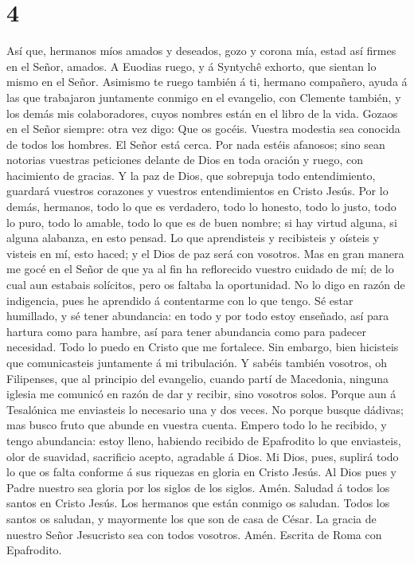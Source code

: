 \hypertarget{section-3}{%
\section{4}\label{section-3}}

 Así que, hermanos míos amados y deseados, gozo y corona
mía, estad así firmes en el Señor, amados.  A Euodias
ruego, y á Syntychê exhorto, que sientan lo mismo en el Señor.
 Asimismo te ruego también á ti, hermano compañero, ayuda
á las que trabajaron juntamente conmigo en el evangelio, con Clemente
también, y los demás mis colaboradores, cuyos nombres están en el libro
de la vida.  Gozaos en el Señor siempre: otra vez digo:
Que os gocéis.  Vuestra modestia sea conocida de todos los
hombres. El Señor está cerca.  Por nada estéis afanosos;
sino sean notorias vuestras peticiones delante de Dios en toda oración y
ruego, con hacimiento de gracias.  Y la paz de Dios, que
sobrepuja todo entendimiento, guardará vuestros corazones y vuestros
entendimientos en Cristo Jesús.  Por lo demás, hermanos,
todo lo que es verdadero, todo lo honesto, todo lo justo, todo lo puro,
todo lo amable, todo lo que es de buen nombre; si hay virtud alguna, si
alguna alabanza, en esto pensad.  Lo que aprendisteis y
recibisteis y oísteis y visteis en mí, esto haced; y el Dios de paz será
con vosotros.  Mas en gran manera me gocé en el Señor de
que ya al fin ha reflorecido vuestro cuidado de mí; de lo cual aun
estabais solícitos, pero os faltaba la oportunidad.  No
lo digo en razón de indigencia, pues he aprendido á contentarme con lo
que tengo.  Sé estar humillado, y sé tener abundancia: en
todo y por todo estoy enseñado, así para hartura como para hambre, así
para tener abundancia como para padecer necesidad.  Todo
lo puedo en Cristo que me fortalece.  Sin embargo, bien
hicisteis que comunicasteis juntamente á mi tribulación. 
Y sabéis también vosotros, oh Filipenses, que al principio del
evangelio, cuando partí de Macedonia, ninguna iglesia me comunicó en
razón de dar y recibir, sino vosotros solos.  Porque aun
á Tesalónica me enviasteis lo necesario una y dos veces. 
No porque busque dádivas; mas busco fruto que abunde en vuestra cuenta.
 Empero todo lo he recibido, y tengo abundancia: estoy
lleno, habiendo recibido de Epafrodito lo que enviasteis, olor de
suavidad, sacrificio acepto, agradable á Dios.  Mi Dios,
pues, suplirá todo lo que os falta conforme á sus riquezas en gloria en
Cristo Jesús.  Al Dios pues y Padre nuestro sea gloria
por los siglos de los siglos. Amén.  Saludad á todos los
santos en Cristo Jesús. Los hermanos que están conmigo os saludan.
 Todos los santos os saludan, y mayormente los que son de
casa de César.  La gracia de nuestro Señor Jesucristo sea
con todos vosotros. Amén. Escrita de Roma con Epafrodito.
